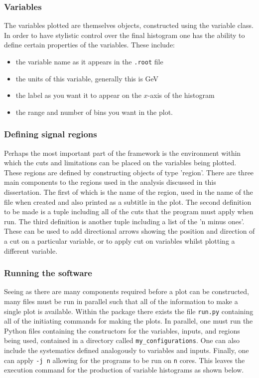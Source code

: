 \subsubsection{Variables}
The variables plotted are themselves objects, constructed using the variable class. 
In order to have stylistic control over the final histogram one has the ability to define certain properties of the variables.
These include:
\begin{itemize}
\item the variable name as it appears in the \texttt{.root} file
\item the units of this variable, generally this is GeV
\item the label as you want it to appear on the $x$-axis of the histogram
\item the range and number of bins you want in the plot.
\end{itemize}

\subsubsection{Defining signal regions}
Perhaps the most important part of the framework is the environment within which the cuts and limitations can be placed on the variables being plotted.
These regions are defined by constructing objects of type 'region'.
There are three main components to the regions used in the analysis discussed in this dissertation.
The first of which is the name of the region, used in the name of the file when created and also printed as a subtitle in the plot.
The second definition to be made is a tuple including all of the cuts that the program must apply when run.
The third definition is another tuple including a list of the 'n minus ones'.
These can be used to add directional arrows showing the position and direction of a cut on a particular variable, or to apply cut on variables whilst plotting a different variable.

\subsubsection{Running the software}
Seeing as there are many components required before a plot can be constructed, many files must be run in parallel such that all of the information to make a single plot is available.
Within the package there exists the file \texttt{run.py} containing all of the initiating commands for making the plots.
In parallel, one must run the Python files containing the constructors for the variables, inputs, and regions being used, contained in a directory called \texttt{my\_configurations}.
One can also include the systematics defined analogously to variables and inputs.
Finally, one can apply \texttt{-j n} allowing for the programs to be run on \texttt{n} cores.
This leaves the execution command for the production of variable histograms as shown below.

